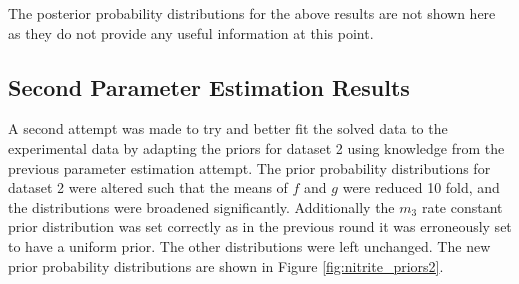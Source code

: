 The posterior probability distributions for the above results are not shown here as they do not provide any useful information at this point.

\subsection{Second Parameter Estimation Results}
A second attempt was made to try and better fit the solved data to the experimental data by adapting the priors for dataset 2 using knowledge from the previous parameter estimation attempt. The prior probability distributions for dataset 2 were altered such that the means of $f$ and $g$ were reduced 10 fold, and the distributions were broadened significantly. Additionally the $m_3$ rate constant prior distribution was set correctly as in the previous round it was erroneously set to have a uniform prior. The other distributions were left unchanged. The new prior probability distributions are shown in Figure \ref{fig:nitrite_priors2}.

